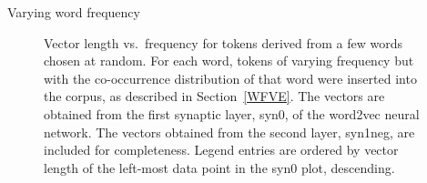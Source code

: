 \documentclass{article} %
\begin{document}
\begin{section}{Varying word frequency}
\begin{figure}
	\caption{ Vector length vs.\ frequency for tokens derived from a
          few words chosen at random.  For each word, tokens of varying
          frequency but with the co-occurrence distribution of that word
          were inserted into the corpus, as described in
          Section~\ref{WFVE}.  The vectors are obtained from the first
          synaptic layer, syn0, of the word2vec neural network.  The
          vectors obtained from the second layer, syn1neg, are included
          for completeness.  Legend entries are ordered by vector length
          of the left-most data point in the syn0 plot, descending.}
	\label{fig:word-frequency-experiment-graph}
\end{figure}
\end{section}
\end{document}
